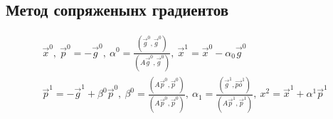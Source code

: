 \subsection{Метод сопряженынх градиентов}
\begin{gather*}
  \vec{x}^0,\ \vec{p}^0 = -\vec{g}^0,\ \alpha^0 = \frac{(\vec{g}^0,
    \vec{g}^0)}{(A\vec{g}^0, \vec{g}^0)},\ \vec{x}^1 = \vec{x}^0 - \alpha_0
  \vec{g}^0 \\ 
  \vec{p}^1 = -\vec{g}^1 + \beta^0 \vec{p}^0,\ \beta^0 =
  \frac{(A\vec{p}^0, \vec{p}^0)}{(A\vec{p}^0, \vec{p}^0)},\ \alpha_1 =
  \frac{(\vec{g}^1, \vec{po}^1)}{(A\vec{p}^1, \vec{p}^1)},\ x^2 = \vec{x}^1 +
  \alpha^1 \vec{p}^1\\
  
\end{gather*}
